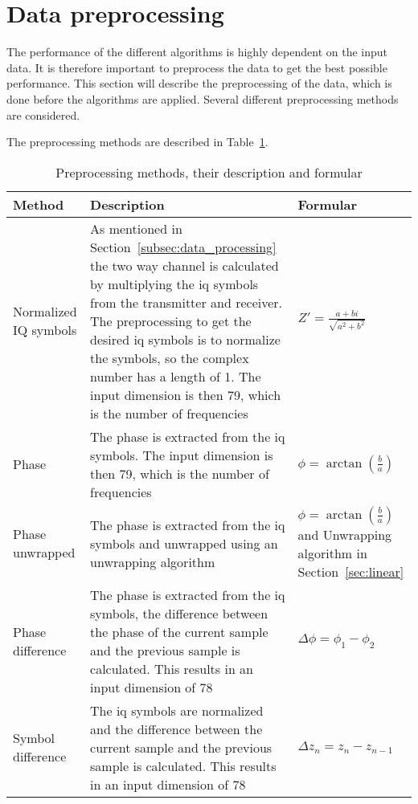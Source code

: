 \section{Data preprocessing} \label{sec:data-preprocessing}
The performance of the different algorithms is highly dependent on the input data.
It is therefore important to preprocess the data to get the best possible performance.
This section will describe the preprocessing of the data, which is done before the algorithms are applied.
Several different preprocessing methods are considered.

The preprocessing methods are described in Table~\ref{tab:preprocessing}.
\begin{table}[H]
    \centering
    \begin{tabular}{p{}p{}p{}}
        \toprule
        Method & Description & Formular \\
        \midrule
        Normalized IQ symbols & As mentioned in Section~\ref{subsec:data_processing} the two way channel is calculated by multiplying the \ac{iq} symbols from the transmitter and receiver.
        The preprocessing to get the desired \ac{iq} symbols is to normalize the symbols, so the complex number has a length of 1.
        The input dimension is then 79, which is the number of frequencies & $Z'=\frac{a+bi}{\sqrt{a^2+b^2}}$\\
        \midrule
        Phase & The phase is extracted from the \ac{iq} symbols.
        The input dimension is then 79, which is the number of frequencies & $\phi=\arctan\left(\frac{b}{a}\right)$\\
        \midrule
        Phase \mbox{unwrapped} & The phase is extracted from the \ac{iq} symbols and unwrapped using an unwrapping algorithm & $\phi=\arctan\left(\frac{b}{a}\right)$ and Unwrapping algorithm in Section~\ref{sec:linear}\\
        \midrule
        Phase \mbox{difference} & The phase is extracted from the \ac{iq} symbols, the difference between the phase of the current sample and the previous sample is calculated.
        This results in an input dimension of 78 & $\Delta\phi = \phi_1 - \phi_2$\\
        \midrule
        Symbol \mbox{difference} & The \ac{iq} symbols are normalized and the difference between the current sample and the previous sample is calculated.
        This results in an input dimension of 78 & $\Delta z_n=z_n-z_{n-1}$\\
        \bottomrule
    \end{tabular}
    \caption{Preprocessing methods, their description and formular}
    \label{tab:preprocessing}
\end{table}
